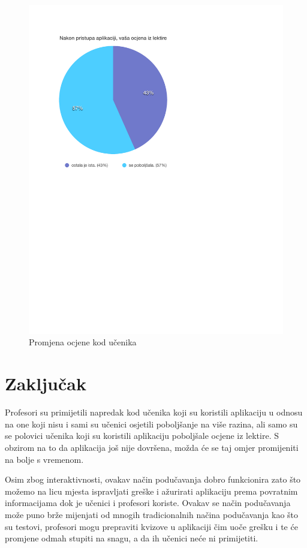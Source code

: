 \documentclass[11pt]{scrreprt}
\begin{document}
\begin{figure}[H]
  \centering
  \includegraphics{student/grades}
  \caption{Promjena ocjene kod učenika}
  \label{fig:student/grades}
\end{figure}

\chapter{Zaključak}

Profesori su primijetili napredak kod učenika koji su koristili aplikaciju u
odnosu na one koji nisu i sami su učenici osjetili poboljšanje na više razina,
ali samo su se polovici učenika koji su koristili aplikaciju poboljšale ocjene
iz lektire. S obzirom na to da aplikacija još nije dovršena, možda će se taj
omjer promijeniti na bolje s vremenom.

Osim zbog interaktivnosti, ovakav način podučavanja dobro funkcionira zato što
možemo na licu mjesta ispravljati greške i ažurirati aplikaciju prema povratnim
informacijama dok je učenici i profesori koriste. Ovakav se način podučavanja
može puno brže mijenjati od mnogih tradicionalnih načina podučavanja kao što su
testovi, profesori mogu prepraviti kvizove u aplikaciji čim uoče grešku i te će
promjene odmah stupiti na snagu, a da ih učenici neće ni primijetiti.
\end{document}
